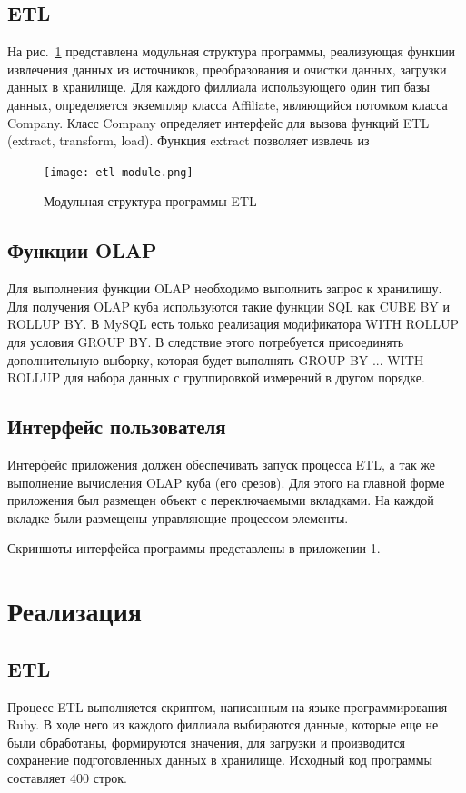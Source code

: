 \subsection{ETL}
На рис.~\ref{etl-module} представлена модульная структура программы, реализующая функции извлечения данных из источников, преобразования и очистки данных, загрузки данных в хранилище. Для каждого филлиала использующего один тип базы данных, определяется экземпляр класса Affiliate, являющийся потомком класса Company. Класс Company определяет интерфейс для вызова функций ETL (extract, transform, load). Функция extract позволяет извлечь из 
\begin{figure}[h]
  \centering
  \texttt{[image: etl-module.png]}
  \caption{Модульная структура программы ETL}
  \label{etl-module}
\end{figure}
\subsection{Функции OLAP}
Для выполнения функции OLAP необходимо выполнить запрос к хранилищу. Для получения OLAP куба используются такие функции SQL как CUBE BY и ROLLUP BY. В MySQL есть только реализация модификатора WITH ROLLUP для условия GROUP BY. В следствие этого потребуется присоединять дополнительную выборку, которая будет выполнять GROUP BY ... WITH ROLLUP для набора данных с группировкой измерений в другом порядке.
\subsection{Интерфейс пользователя}
Интерфейс приложения должен обеспечивать запуск процесса ETL, а так же выполнение вычисления OLAP куба (его срезов). Для этого на главной форме приложения был размещен объект с переключаемыми вкладками. На каждой вкладке были размещены управляющие процессом элементы.\par
Скриншоты интерфейса программы представлены в приложении 1.
\section{Реализация}
\subsection{ETL}
Процесс ETL выполняется скриптом, написанным на языке программирования Ruby. В ходе него из каждого филлиала выбираются данные, которые еще не были обработаны, формируются значения, для загрузки и производится сохранение подготовленных данных в хранилище. Исходный код программы составляет 400 строк.
